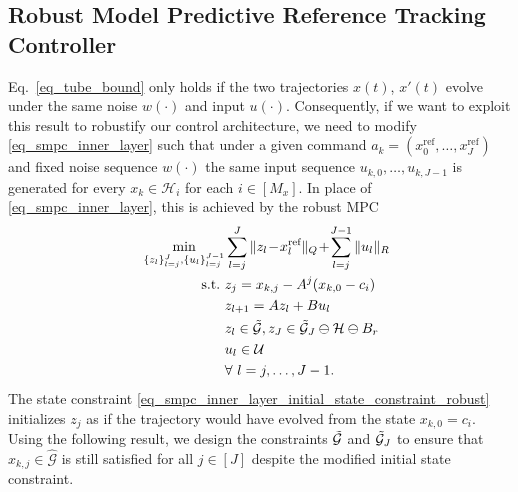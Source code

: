 \documentclass{IEEEtran}
\begin{document}
\subsection{Robust Model Predictive Reference Tracking Controller}
Eq.~\eqref{eq_tube_bound} only holds if the two trajectories $x(t)$, $x'(t)$ evolve under the same noise $w(\cdot)$ and input $u(\cdot)$. Consequently, if we want to exploit this result to robustify our control architecture, we need to modify \eqref{eq_smpc_inner_layer} such that under a given command $a_k=({x}^{\text{ref}}_0,\dots,{x}^{\text{ref}}_J)$ and fixed noise sequence $w(\cdot)$ the same input sequence $u_{k,0},\dots,u_{k,J-1}$ is generated for every $x_k\in\mathcal{H}_i$ for each $i\in[M_x]$. In place of \eqref{eq_smpc_inner_layer}, this is achieved by the robust MPC%
\begin{subequations}%
    \makeatletter%
    \def\@currentlabel{RMPC}%
    \makeatother%
    \label{eq_smpc_inner_layer_robust}%
    \renewcommand{\theequation}{RMPC.\arabic{equation}}%
\begin{align}
    &&\min_{\{z_l\}_{l=j}^J,  \{u_l\}_{l=j}^{J-1}} & \sum_{l=j}^{J} \|z_l\!-\!x_{l}^{\text{ref}}\|_{ Q}\!+\!\sum_{l=j}^{J-1}\|u_l\|_R \\
    &&\text{s.t.} \  & z_j = x_{k,j} - A^j(x_{k,0}-c_i) \label{eq_smpc_inner_layer_initial_state_constraint_robust}\\
    &&& z_{l+1} = Az_l + Bu_l \\
    &&& {z}_{l} \in \Tilde{\mathcal{G}}\label{smpc_terminal_state_constraint}, z_{J}\in \Tilde{\mathcal{G}}_J\ominus\mathcal{H}\ominus B_r 
    \\ &&& u_l\in\mathcal{U}
    \\&&& \forall \ l=j,\dots,J-1.
\end{align}
\end{subequations}
The state constraint \eqref{eq_smpc_inner_layer_initial_state_constraint_robust} initializes $z_j$ as if the trajectory would have evolved from the state $x_{k,0}=c_i$. Using the following result, we design the constraints $\Tilde{\mathcal{G}}$ and $\Tilde{\mathcal{G}}_J$ to ensure that $x_{k,j}\in\hat{\mathcal{G}}$ is still satisfied for all $j\in[J]$ despite the modified initial state constraint. 
\end{document}
